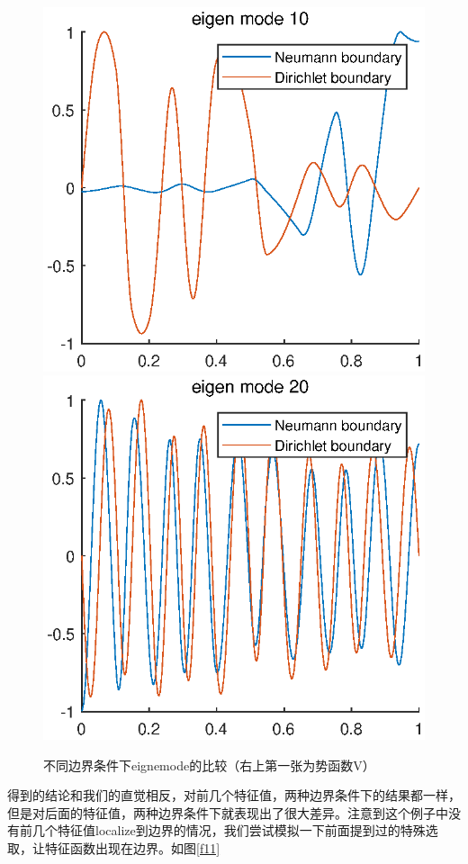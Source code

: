 \documentclass[UTF8,12pt]{article}
\begin{document}
\begin{figure}[htbp]
    \includegraphics[width=0.24\linewidth]{pic/mei10}
    \includegraphics[width=0.24\linewidth]{pic/mei20}
    \label{f10}
\caption{不同边界条件下eignemode的比较（右上第一张为势函数V）}
\end{figure}

得到的结论和我们的直觉相反，对前几个特征值，两种边界条件下的结果都一样，但是对后面的特征值，两种边界条件下就表现出了很大差异。注意到这个例子中没有前几个特征值localize到边界的情况，我们尝试模拟一下前面提到过的特殊选取，让特征函数出现在边界。如图\ref{f11}
\end{document}
